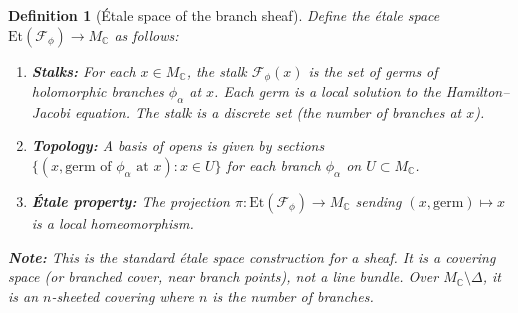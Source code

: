 \documentclass[11pt]{article}
\newtheorem{definition}[theorem]{Definition}
\begin{document}
\begin{definition}[Étale space of the branch sheaf]
\label{def:etale-char}
Define the étale space $\mathrm{Et}(\mathcal{F}_\phi) \to M_\mathbb{C}$ as follows:
\begin{enumerate}
  \item \textbf{Stalks:} For each $x \in M_\mathbb{C}$, the stalk
        $\mathcal{F}_\phi(x)$ is the set of germs of holomorphic branches
        $\phi_\alpha$ at $x$. Each germ is a local solution to the
        Hamilton--Jacobi equation. The stalk is a discrete set (the number
        of branches at $x$).

  \item \textbf{Topology:} A basis of opens is given by sections
        $\{(x, \text{germ of }\phi_\alpha \text{ at } x) : x \in U\}$
        for each branch $\phi_\alpha$ on $U \subset M_\mathbb{C}$.

  \item \textbf{Étale property:} The projection
        $\pi: \mathrm{Et}(\mathcal{F}_\phi) \to M_\mathbb{C}$ sending
        $(x, \text{germ}) \mapsto x$ is a local homeomorphism.
\end{enumerate}

\textbf{Note:} This is the standard étale space construction for a sheaf.
It is a \emph{covering space} (or branched cover, near branch points),
not a line bundle. Over $M_\mathbb{C} \setminus \Delta$, it is an
$n$-sheeted covering where $n$ is the number of branches.
\end{definition}
\end{document}
